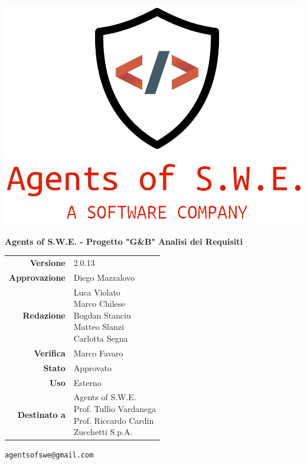 


\begin{titlepage}
\thispagestyle{empty}

\begin{center}

\includegraphics[scale=0.3]{./images/logo.png} 

\large \textbf{Agents of S.W.E. - Progetto "G\&B"}
\vfill
\Huge \textbf{Analisi dei Requisiti}
\vfill
\large
\renewcommand{\arraystretch}{1.3}
\begin{tabular}{r|l}
\textbf{Versione} & 2.0.13\\
\textbf{Approvazione} & Diego Mazzalovo\\
\textbf{Redazione} & \parbox[t]{5cm}{Luca Violato\\Marco Chilese\\Bogdan Stanciu\\Matteo Slanzi\\ Carlotta Segna}\\
\textbf{Verifica} & \parbox[t]{5cm}{Marco Favaro}\\
\textbf{Stato} & Approvato\\
\textbf{Uso} & Esterno\\
\textbf{Destinato a} & \parbox[t]{5cm}{Agents of S.W.E. \\Prof. Tullio Vardanega\\Prof. Riccardo Cardin \\ Zucchetti S.p.A.}
\end{tabular}
\vfill
\small
\texttt{agentsofswe@gmail.com}
\end{center}
\end{titlepage}

